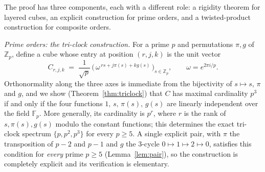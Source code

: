 \documentclass[11pt]{amsart}
\theoremstyle{definition}
\newcommand{\Z}{\mathbb{Z}}
\newcommand{\F}{\mathbb{F}}
\begin{document}
The proof has three components, each with a different role: a
rigidity theorem for layered cubes, an explicit construction for prime
orders, and a twisted-product construction for composite orders.

\emph{Prime orders: the tri-clock construction.}  For a prime $p$ and
permutations $\pi,g$ of $\Z_p$, define a cube whose entry at position
$(r,j,k)$ is the unit vector
\[
C_{r,j,k}\;=\;\frac1{\sqrt p}\,
\bigl(\,\omega^{\,rs+j\pi(s)+kg(s)}\,\bigr)_{s\in\Z_p},
\qquad \omega=e^{2\pi i/p}.
\]
Orthonormality along the three axes is immediate from the bijectivity of
$s\mapsto s$, $\pi$ and $g$, and we show
(Theorem~\ref{thm:triclock}) that $C$ has maximal cardinality $p^3$ if and
only if the four functions $1,\,s,\,\pi(s),\,g(s)$ are linearly independent
over the field $\F_p$.  More generally, its cardinality is $p^r$, where $r$
is the rank of $s,\pi(s),g(s)$ modulo the constant functions; this determines
the exact tri-clock spectrum $\{p,p^2,p^3\}$ for every $p\ge5$.  A single
explicit pair, with $\pi$ the transposition
of $p-2$ and $p-1$ and $g$ the $3$-cycle $0\mapsto1\mapsto2\mapsto0$,
satisfies this condition for \emph{every} prime $p\ge5$
(Lemma~\ref{lem:pair}), so the construction is completely explicit and its
verification is elementary.
\end{document}
